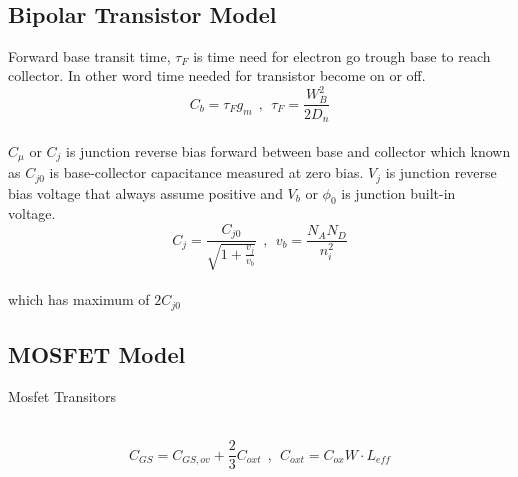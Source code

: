~\vspace{-3em}
\subsection{Bipolar Transistor Model}\vspace{0.5em}
Forward base transit time, $\tau_F$ is time need for electron go trough base to reach collector. In other word time needed for transistor become on or off. ~\\
\begin{equation}
C_b = \tau_F g_m ~~ , ~~\tau_F = \frac{W_B^2}{2D_n}
\end{equation}
~\\
$C_{\mu}$ or $C_j$ is junction reverse bias forward between base and collector which known as $C_{j0}$ is base-collector capacitance measured at zero bias. $V_j$ is junction reverse bias voltage that always assume positive and $V_b$ or $\phi_0$ is junction built-in voltage.~\\
\begin{equation}
C_j = \frac{C_{j0}}{\sqrt{1 + \frac{v_j}{v_b}}} ~~ , ~~ v_b = \frac{N_A N_D}{n_i^2} 
\end{equation}
~\\which has maximum of $ 2 C_{j0} $

\par
\setlength{\parindent}{0.5cm} %
\lipsum[1]
\setlength{\parindent}{0.0cm} 
\subsection{MOSFET Model}\vspace{0.5em}
Mosfet Transitors

~\\
\begin{equation}
C_{GS} = C_{GS,ov} + \frac{2}{3} C_{oxt} ~~ , ~~ C_{oxt} = C_{ox} W \cdot L_{eff}
\end{equation}
